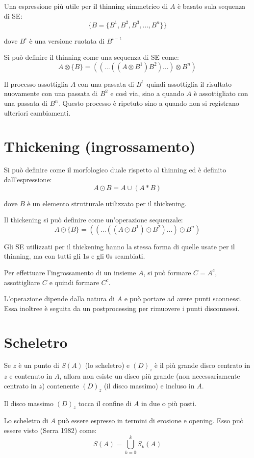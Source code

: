 Una espressione più utile per il thinning simmetrico di $A$ è basato sula sequenza di SE:
$$
\{B = \{B^1, B^2, B^3, \dots, B^n \} \}
$$

dove $B^i$ è una versione ruotata di $B^{i-1}$

Si può definire il thinning come una sequenza di SE come:
$$
A \otimes \{B \} = ((\dots ((A \otimes B^1) B^2) \dots) \otimes B^n)
$$

Il processo assottiglia $A$ con una passata di $B^1$ quindi assottiglia il risultato nuovamente con una passata di $B^2$ e così via, sino a quando $A$ è assottigliato con una passata di $B^n$. Questo processo è ripetuto sino a quando non si registrano ulteriori cambiamenti.

\section{Thickening (ingrossamento)}
Si può definire come il morfologico duale rispetto al thinning ed è definito dall'espressione:
$$
A \odot B = A \cup (A * B)
$$

dove $B$ è un elemento strutturale utilizzato per il thickening.

Il thickening si può definire come un'operazione sequenzale:
$$
A \odot \{B\} = ((\dots((A \odot B^1) \odot B^2)\dots)\odot B^n)
$$

Gli SE utilizzati per il thickening hanno la stessa forma di quelle usate per il thinning, ma con tutti gli 1s e gli 0s scambiati.

Per effettuare l'ingrossamento di un insieme $A$, si può formare $C = A^c$, assottigliare $C$ e quindi formare $C^c$.

L'operazione dipende dalla natura di $A$ e può portare ad avere punti sconnessi. Essa inoltree è seguita da un postprocessing per rimuovere i punti disconnessi.

\section{Scheletro}
Se $z$ è un punto di $S(A)$ (lo scheletro) e $(D)_z$ è il più grande disco centrato in $z$ e contenuto in $A$, allora non esiste un disco più grande (non necessariamente centrato in $z$) contenente $(D)_z$ (il disco massimo) e incluso in $A$.

Il disco massimo $(D)_z$ tocca il confine di $A$ in due o più posti.

Lo scheletro di $A$ può essere espresso in termini di erosione e opening. Esso può essere visto (Serra 1982) come:
$$
S(A) = \bigcup_{k=0}^k S_k (A)
$$

